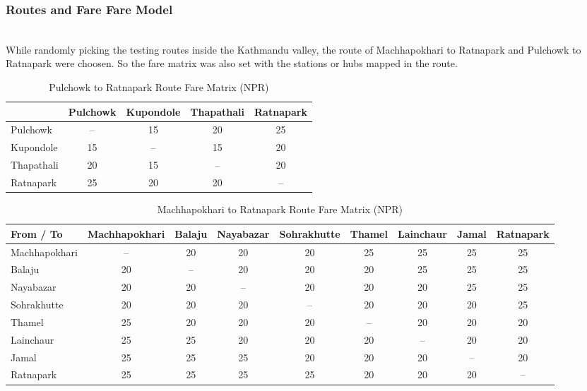 \documentclass[sigconf, nonacm]{acmart}
\begin{document}
\subsubsection{Routes and Fare Fare Model} \mbox{} \\

While randomly picking the testing routes inside the Kathmandu valley, the route of Machhapokhari to Ratnapark and Pulchowk to Ratnapark were choosen. So the fare matrix was also set with the stations or hubs mapped in the route.

\begin{table}[H]
\centering
\caption{Pulchowk to Ratnapark Route Fare Matrix (NPR)}
\label{tab:pulchowk_fare_matrix}
\begin{tabular}{lcccc}
\toprule
\textbf{} & \textbf{Pulchowk} & \textbf{Kupondole} & \textbf{Thapathali} & \textbf{Ratnapark} \\
\midrule
Pulchowk   & -- & 15 & 20 & 25 \\
Kupondole  & 15 & -- & 15 & 20 \\
Thapathali & 20 & 15 & -- & 20 \\
Ratnapark  & 25 & 20 & 20 & -- \\
\bottomrule
\end{tabular}
\end{table}

\begin{table}[t]
\centering
\caption{Machhapokhari to Ratnapark Route Fare Matrix (NPR)}
\label{tab:fare_matrix_machha}
\begin{tabular}{lcccccccc}
\toprule
\textbf{From / To} & \textbf{Machhapokhari} & \textbf{Balaju} & \textbf{Nayabazar} & \textbf{Sohrakhutte} & \textbf{Thamel} & \textbf{Lainchaur} & \textbf{Jamal} & \textbf{Ratnapark} \\
\midrule
Machhapokhari & -- & 20 & 20 & 20 & 25 & 25 & 25 & 25 \\
Balaju        & 20 & -- & 20 & 20 & 20 & 25 & 25 & 25 \\
Nayabazar     & 20 & 20 & -- & 20 & 20 & 20 & 25 & 25 \\
Sohrakhutte   & 20 & 20 & 20 & -- & 20 & 20 & 20 & 25 \\
Thamel        & 25 & 20 & 20 & 20 & -- & 20 & 20 & 20 \\
Lainchaur     & 25 & 25 & 20 & 20 & 20 & -- & 20 & 20 \\
Jamal         & 25 & 25 & 25 & 20 & 20 & 20 & -- & 20 \\
Ratnapark     & 25 & 25 & 25 & 25 & 20 & 20 & 20 & -- \\
\bottomrule
\end{tabular}
\end{table}
\end{document}
